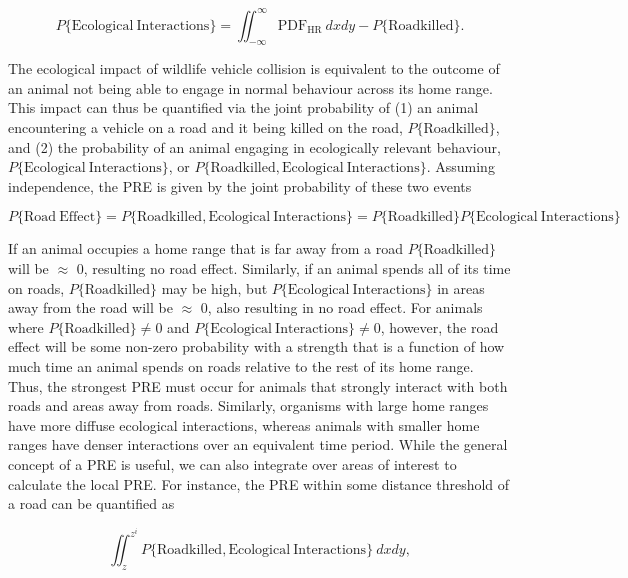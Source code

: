 \documentclass[11pt]{article}
\begin{document}
\begin{equation}
P\{\mathrm{Ecological~Interactions}\} = \iint_{-\infty}^\infty \mathrm{PDF_{HR}}~dxdy - P\{\mathrm{Roadkilled}\}.
\end{equation}

The ecological impact of wildlife vehicle collision is equivalent to the outcome of an animal not being able to engage in normal behaviour across its home range. This impact can thus be quantified via the joint probability of (1) an animal encountering a vehicle on a road and it being killed on the road, $P\{\mathrm{Roadkilled}\}$, and (2) the probability of an animal engaging in ecologically relevant behaviour, $P\{\mathrm{Ecological~Interactions}\}$, or $P\{\mathrm{Roadkilled},\mathrm{Ecological~Interactions}\}$. Assuming independence, the PRE is given by the joint probability of these two events

\begin{equation}
P\{\mathrm{Road~Effect}\} = P\{\mathrm{Roadkilled},\mathrm{Ecological~Interactions}\} = P\{\mathrm{Roadkilled}\}P\{\mathrm{Ecological~Interactions}\}
\end{equation}

If an animal occupies a home range that is far away from a road $P\{\mathrm{Roadkilled}\}$ will be $\approx$ 0, resulting no road effect. Similarly, if an animal spends all of its time on roads, $P\{\mathrm{Roadkilled}\}$ may be high, but $P\{\mathrm{Ecological~Interactions}\}$ in areas away from the road will be $\approx$ 0, also resulting in no road effect. For animals where $P\{\mathrm{Roadkilled}\} \neq 0$ and $P\{\mathrm{Ecological~Interactions}\} \neq 0$, however, the road effect will be some non-zero probability with a strength that is a function of how much time an animal spends on roads relative to the rest of its home range. Thus, the strongest PRE must occur for animals that strongly interact with both roads and areas away from roads.  Similarly, organisms with large home ranges have more diffuse ecological interactions, whereas animals with smaller home ranges have denser interactions over an equivalent time period. While the general concept of a PRE is useful, we can also integrate over areas of interest to calculate the local PRE. For instance, the PRE within some distance threshold of a road can be quantified as

\begin{equation}
\iint_{z}^{z^i} P\{\mathrm{Roadkilled},\mathrm{Ecological~Interactions}\}~dxdy,
\end{equation}
\end{document}
